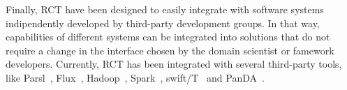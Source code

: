 \documentclass[preprint,12pt, a4paper]{elsarticle}
\begin{document}


Finally, RCT have been designed to easily integrate with software systems
indipendently developed by third-party development groups. In that way,
capabilities of different systems can be integrated into solutions that do not
require a change in the interface chosen by the domain scientist or famework
developers. Currently, RCT has been integrated with several third-party tools,
like Parsl~\cite{alsaadi2022radical}, Flux~\cite{rp-flux-url},
Hadoop~\cite{luckow2016hadoop}, Spark~\cite{paraskevakos2018task},
swift/T~\cite{turilli2016integrating} and PanDA~\cite{merzky2019panda}.


\end{document}
